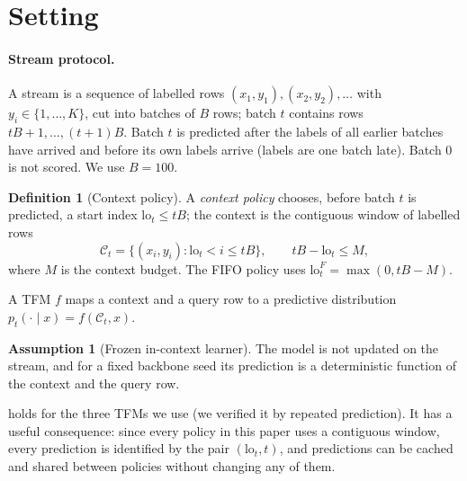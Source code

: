 \documentclass[10pt]{article}
\theoremstyle{definition}
\newtheorem{definition}{Definition}
\newtheorem{assumption}{Assumption}
\theoremstyle{remark}
\newcommand{\ctx}{\mathcal{C}}
\begin{document}
\section{Setting}
\label{sec:setting}

\paragraph{Stream protocol.}
A stream is a sequence of labelled rows $(x_1,y_1),(x_2,y_2),\dots$ with $y_i\in\{1,\dots,K\}$, cut into batches of
$B$ rows; batch $t$ contains rows $tB+1,\dots,(t+1)B$. Batch $t$ is predicted after the labels of all earlier batches
have arrived and before its own labels arrive (labels are one batch late). Batch $0$ is not scored. We use $B=100$.

\begin{definition}[Context policy]
\label{def:policy}
A \emph{context policy} chooses, before batch $t$ is predicted, a start index $\mathrm{lo}_t\le tB$; the context is
the contiguous window of labelled rows
\begin{equation}
  \ctx_t=\{(x_i,y_i): \mathrm{lo}_t< i\le tB\},\qquad tB-\mathrm{lo}_t\le M,
\end{equation}
where $M$ is the context budget. The FIFO policy uses $\mathrm{lo}^{F}_t=\max(0,tB-M)$.
\end{definition}

A TFM $f$ maps a context and a query row to a predictive distribution $p_t(\cdot\mid x)=f(\ctx_t,x)$.

\begin{assumption}[Frozen in-context learner]
\label{ass:frozen}
The model is not updated on the stream, and for a fixed backbone seed its prediction is a deterministic function of the
context and the query row.
\end{assumption}

 holds for the three TFMs we use (we verified it by repeated prediction). It has a useful consequence:
since every policy in this paper uses a contiguous window, every prediction is identified by the pair
$(\mathrm{lo}_t,t)$, and predictions can be cached and shared between policies without changing any of them.
\end{document}
